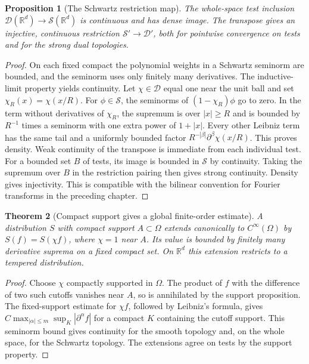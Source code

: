 \documentclass[11pt,oneside,openany]{book}
\newtheorem{theorem}{Theorem}[chapter]
\newtheorem{proposition}[theorem]{Proposition}
\theoremstyle{definition}
\theoremstyle{remark}
\begin{document}
\begin{proposition}[The Schwartz restriction map]
\label{p102:U4-01}
The whole-space test inclusion \(\mathcal D(\mathbb R^d)\to\mathcal S(\mathbb R^d)\) is continuous and has dense image. The transpose gives an injective, continuous restriction \(\mathcal S'\to\mathcal D'\), both for pointwise convergence on tests and for the strong dual topologies.
\end{proposition}
\begin{proof}
On each fixed compact the polynomial weights in a Schwartz seminorm are bounded, and the seminorm uses only finitely many derivatives. The inductive-limit property yields continuity. Let \(\chi\in\mathcal D\) equal one near the unit ball and set \(\chi_R(x)=\chi(x/R)\). For \(\phi\in\mathcal S\), the seminorms of \((1-\chi_R)\phi\) go to zero. In the term without derivatives of \(\chi_R\), the supremum is over \(|x|\geq R\) and is bounded by \(R^{-1}\) times a seminorm with one extra power of \(1+|x|\). Every other Leibniz term has the same tail and a uniformly bounded factor \(R^{-|\beta|}\partial^\beta\chi(x/R)\). This proves density. Weak continuity of the transpose is immediate from each individual test. For a bounded set \(B\) of tests, its image is bounded in \(\mathcal S\) by continuity. Taking the supremum over \(B\) in the restriction pairing then gives strong continuity. Density gives injectivity. This is compatible with the bilinear convention for Fourier transforms in the preceding chapter.
\end{proof}

\begin{theorem}[Compact support gives a global finite-order estimate]
\label{p102:U4-02}
A distribution \(S\) with compact support \(A\subset\Omega\) extends canonically to \(C^\infty(\Omega)\) by \(S(f)=S(\chi f)\), where \(\chi=1\) near \(A\). Its value is bounded by finitely many derivative suprema on a fixed compact set. On \(\mathbb R^d\) this extension restricts to a tempered distribution.
\end{theorem}
\begin{proof}
Choose \(\chi\) compactly supported in \(\Omega\). The product of \(f\) with the difference of two such cutoffs vanishes near \(A\), so is annihilated by the support proposition. The fixed-support estimate for \(\chi f\), followed by Leibniz's formula, gives \(C\max_{|\alpha|\leq m}\sup_K|\partial^\alpha f|\) for a compact \(K\) containing the cutoff support. This seminorm bound gives continuity for the smooth topology and, on the whole space, for the Schwartz topology. The extensions agree on tests by the support property.
\end{proof}
\end{document}
